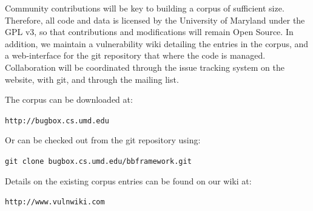 \documentclass[letterpaper,twocolumn,10pt]{article}
\begin{document}
Community contributions will be key to building a corpus of sufficient size. Therefore, all code and data is licensed by the University of Maryland under the GPL v3, so that contributions and modifications will remain Open Source. In addition, we maintain a vulnerability wiki detailing the entries in the corpus, and a web-interface for the git repository that where the code is managed. Collaboration will be coordinated through the issue tracking system on the website, with git, and through the mailing list. \par

The corpus can be downloaded at:

\begin{center}
{\tt  http://bugbox.cs.umd.edu}
\end{center}

Or can be checked out from the git repository using:

\begin{center}
{\tt git clone bugbox.cs.umd.edu/bbframework.git}
\end{center}

Details on the existing corpus entries can be found on our wiki at:

\begin{center}
{\tt http://www.vulnwiki.com}
\end{center}

{\footnotesize 
}
\end{document}
